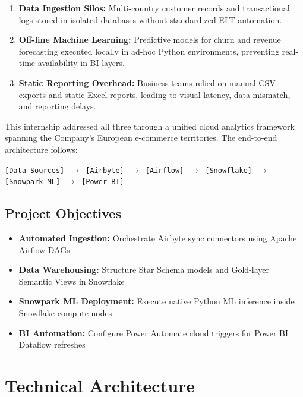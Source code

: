 \documentclass[11pt,a4paper]{article}
\begin{document}
\begin{enumerate}[leftmargin=*,noitemsep,topsep=2pt]
    \item \textbf{Data Ingestion Silos:} Multi-country customer records and transactional logs stored in isolated databases without standardized ELT automation.
    \item \textbf{Off-line Machine Learning:} Predictive models for churn and revenue forecasting executed locally in ad-hoc Python environments, preventing real-time availability in BI layers.
    \item \textbf{Static Reporting Overhead:} Business teams relied on manual CSV exports and static Excel reports, leading to visual latency, data mismatch, and reporting delays.
\end{enumerate}

This internship addressed all three through a unified cloud analytics framework spanning the Company's European e-commerce territories. The end-to-end architecture follows:

\begin{center}
\small
\texttt{[Data Sources] $\rightarrow$ [Airbyte] $\rightarrow$ [Airflow] $\rightarrow$ [Snowflake] $\rightarrow$ [Snowpark ML] $\rightarrow$ [Power BI]}
\end{center}

\subsection{Project Objectives}

\begin{itemize}[leftmargin=*,noitemsep,topsep=2pt]
    \item \textbf{Automated Ingestion:} Orchestrate Airbyte sync connectors using Apache Airflow DAGs
    \item \textbf{Data Warehousing:} Structure Star Schema models and Gold-layer Semantic Views in Snowflake
    \item \textbf{Snowpark ML Deployment:} Execute native Python ML inference inside Snowflake compute nodes
    \item \textbf{BI Automation:} Configure Power Automate cloud triggers for Power BI Dataflow refreshes
\end{itemize}

\section{Technical Architecture}
\end{document}
